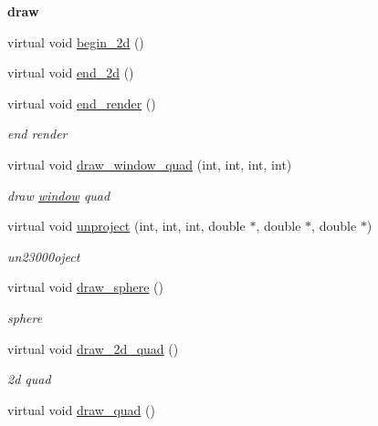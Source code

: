 \begin{Indent}{\bf draw}
\begin{DoxyCompactItemize}
virtual void \hyperlink{classnebula_1_1platform_1_1renderer_1_1gl_1_1base_aa41ad5ca7c94ba066c7e9ee99574d4ef}{begin\_\-2d} ()
\item 
virtual void \hyperlink{classnebula_1_1platform_1_1renderer_1_1gl_1_1base_ac543d418a1acc58a178e96f552af1aca}{end\_\-2d} ()
\item 
virtual void \hyperlink{classnebula_1_1platform_1_1renderer_1_1gl_1_1base_ae07ce667896249b4b60e800a985f0721}{end\_\-render} ()
\begin{DoxyCompactList}\small\item\em end render \item\end{DoxyCompactList}\item 
virtual void \hyperlink{classnebula_1_1platform_1_1renderer_1_1gl_1_1base_abd5831cdc84edc5bece8a23296acba2b}{draw\_\-window\_\-quad} (int, int, int, int)
\begin{DoxyCompactList}\small\item\em draw \hyperlink{namespacenebula_1_1platform_1_1window}{window} quad \item\end{DoxyCompactList}\item 
virtual void \hyperlink{classnebula_1_1platform_1_1renderer_1_1gl_1_1base_a6f060e673e035fb037517423351ae11c}{unproject} (int, int, int, double $\ast$, double $\ast$, double $\ast$)
\begin{DoxyCompactList}\small\item\em un23000oject \item\end{DoxyCompactList}\item 
virtual void \hyperlink{classnebula_1_1platform_1_1renderer_1_1gl_1_1base_a0c7b5d23095d7efe88dbfa57f2010b4a}{draw\_\-sphere} ()
\begin{DoxyCompactList}\small\item\em sphere \item\end{DoxyCompactList}\item 
virtual void \hyperlink{classnebula_1_1platform_1_1renderer_1_1gl_1_1base_a007d1a2ca36da4ab31b1eeba38b6a3b0}{draw\_\-2d\_\-quad} ()
\begin{DoxyCompactList}\small\item\em 2d quad \item\end{DoxyCompactList}\item 
virtual void \hyperlink{classnebula_1_1platform_1_1renderer_1_1gl_1_1base_acbfb1696354adcef364326a1864dc3fc}{draw\_\-quad} ()

\end{DoxyCompactItemize}
\end{Indent}
